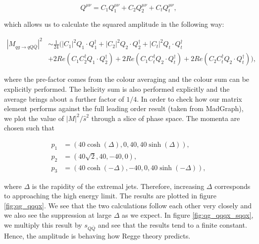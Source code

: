 \begin{equation}
Q^{\mu \nu} = C_1 Q^{\mu \nu}_1 + C_2 Q^{\mu \nu}_2 + C_t Q^{\mu \nu}_t,
\end{equation}

which allows us to calculate the squared amplitude in the following way:

\begin{equation}
\begin{split}
|M_{qg \to qQ\bar{Q}}|^2 &\sim \frac{1}{24} \bigg(|C_1|^2 Q_1\cdot Q_1^\dagger + |C_2|^2 Q_2 \cdot Q_2^\dagger + |C_t|^2 Q_t \cdot Q_t^\dagger \\
&+ 2 Re(C_1 C_2^\dagger Q_1 \cdot Q_2^{\dagger}) + 2 Re(C_1 C_t^\dagger Q_2 \cdot Q_t^\dagger) + 2 Re(C_2 C_t^\dagger Q_2 \cdot Q_t^\dagger) \bigg),
\end{split}
\end{equation}

where the pre-factor comes from the colour averaging and the colour sum can be explicitly performed. The helicity sum is also performed explicitly and the average brings about a further factor of $1/4$. In order to check how our matrix element performs against the full leading order result (taken from MadGraph), we plot the value of $|M|^2/\hat{s}^2$ through a slice of phase space. The momenta are chosen such that

\begin{equation}
\begin{split}
p_1 & = (40 \cosh(\Delta), 0, 40, 40 \sinh(\Delta)), \\
p_2 & = (40 \sqrt{2}, 40 , -40, 0), \\
p_3 & = (40 \cosh(-\Delta), -40, 0, 40 \sinh(-\Delta)), 
\end{split}
\end{equation}

where $\Delta$ is the rapidity of the extremal jets. Therefore, increasing $\Delta$ corresponds to approaching the high energy limit. The results are plotted in figure \ref{fig:qg_qqqx}. We see that the two calculations follow each other very closely and we also see the suppression at large $\Delta$ as we expect. In figure \ref{fig:qg_qqqx_sqqx}, we multiply this result by $s_{Q \bar{Q}}$ and see that the results tend to a finite constant. Hence, the amplitude is behaving how Regge theory predicts.

